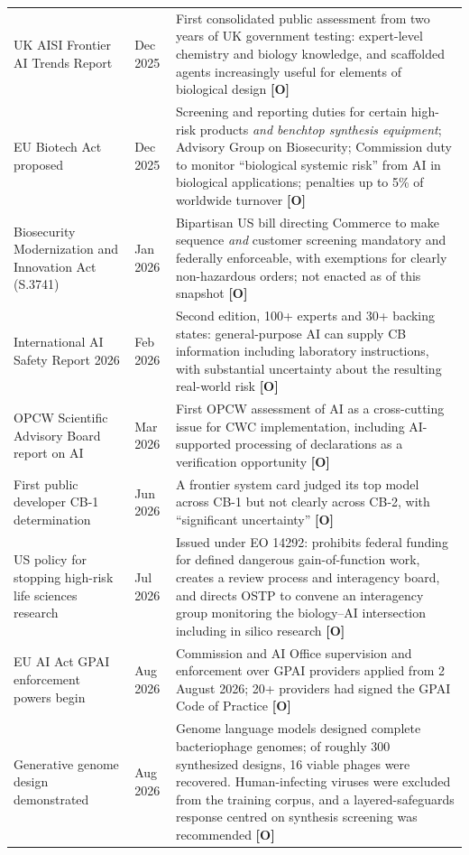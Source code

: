 \documentclass[11pt,letterpaper]{article}
\begin{document}
\begin{center}
\begin{longtable}{L{4cm}L{1.8cm}L{9.2cm}}
UK AISI Frontier AI Trends Report & Dec 2025 & First consolidated public assessment from two years of UK government testing: expert-level chemistry and biology knowledge, and scaffolded agents increasingly useful for elements of biological design \textbf{[O]} \\
EU Biotech Act proposed & Dec 2025 & Screening and reporting duties for certain high-risk products \textit{and benchtop synthesis equipment}; Advisory Group on Biosecurity; Commission duty to monitor ``biological systemic risk'' from AI in biological applications; penalties up to 5\% of worldwide turnover \textbf{[O]} \\
Biosecurity Modernization and Innovation Act (S.3741) & Jan 2026 & Bipartisan US bill directing Commerce to make sequence \textit{and} customer screening mandatory and federally enforceable, with exemptions for clearly non-hazardous orders; not enacted as of this snapshot \textbf{[O]} \\
International AI Safety Report 2026 & Feb 2026 & Second edition, 100+ experts and 30+ backing states: general-purpose AI can supply CB information including laboratory instructions, with substantial uncertainty about the resulting real-world risk \textbf{[O]} \\
OPCW Scientific Advisory Board report on AI & Mar 2026 & First OPCW assessment of AI as a cross-cutting issue for CWC implementation, including AI-supported processing of declarations as a verification opportunity \textbf{[O]} \\
First public developer CB-1 determination & Jun 2026 & A frontier system card judged its top model across CB-1 but not clearly across CB-2, with ``significant uncertainty'' \textbf{[O]} \\
US policy for stopping high-risk life sciences research & Jul 2026 & Issued under EO 14292: prohibits federal funding for defined dangerous gain-of-function work, creates a review process and interagency board, and directs OSTP to convene an interagency group monitoring the biology--AI intersection including in silico research \textbf{[O]} \\
EU AI Act GPAI enforcement powers begin & Aug 2026 & Commission and AI Office supervision and enforcement over GPAI providers applied from 2 August 2026; 20+ providers had signed the GPAI Code of Practice \textbf{[O]} \\
Generative genome design demonstrated & Aug 2026 & Genome language models designed complete bacteriophage genomes; of roughly 300 synthesized designs, 16 viable phages were recovered. Human-infecting viruses were excluded from the training corpus, and a layered-safeguards response centred on synthesis screening was recommended \textbf{[O]} \\

\end{longtable}
\end{center}
\end{document}
